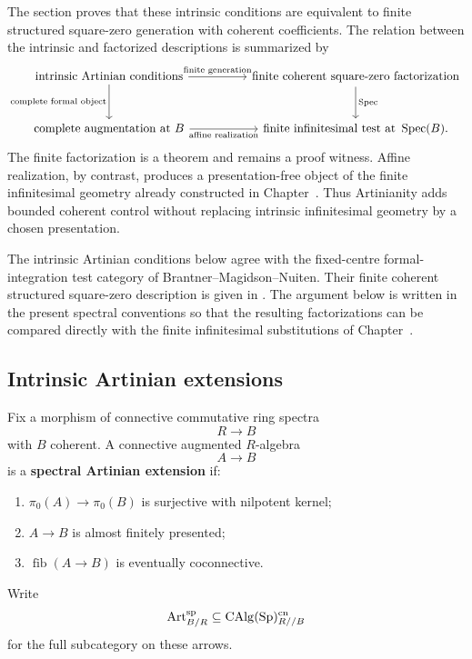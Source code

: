 The section proves that these intrinsic conditions are equivalent to finite structured
square-zero generation with coherent coefficients. The relation between the intrinsic
and factorized descriptions is summarized by
\[
\begin{tikzcd}[column sep=huge,row sep=large]
    \text{intrinsic Artinian conditions}
        \arrow[r,"\text{finite generation}"]
        \arrow[d,"\text{complete formal object}"']
    &
    \text{finite coherent square-zero factorization}
        \arrow[d,"\operatorname{Spec}"]
    \\
    \text{complete augmentation at }B
        \arrow[r,"\text{affine realization}"']
    &
    \text{finite infinitesimal test at }\Spec(B).
\end{tikzcd}
\]
The finite factorization is a theorem and remains a proof witness. Affine realization,
by contrast, produces a presentation-free object of the finite infinitesimal geometry
already constructed in Chapter~. Thus
Artinianity adds bounded coherent control without replacing intrinsic infinitesimal
geometry by a chosen presentation.

\begin{remark}
\label{rem:bmn-artinian-comparison}
The intrinsic Artinian conditions below agree with the fixed-centre
formal-integration test category of Brantner--Magidson--Nuiten. Their
finite coherent structured square-zero description is given in
\cite[
    Proposition~4.3 and Corollaries~4.4--4.5
]{BrantnerMagidsonNuiten}. The argument below is written in the present
spectral conventions so that the resulting factorizations can be compared
directly with the finite infinitesimal substitutions of
Chapter~.
\end{remark}

\subsection{Intrinsic Artinian extensions}

\begin{definition}
\label{def:spectral-artinian-extension}
Fix a morphism of connective commutative ring spectra
\[
    R\longrightarrow B
\]
with \(B\) coherent. A connective augmented \(R\)-algebra
\[
    A\longrightarrow B
\]
is a \textbf{spectral Artinian extension} if:
\begin{enumerate}[label=(\roman*)]
    \item \(\pi_0(A)\to\pi_0(B)\) is surjective with nilpotent kernel;
    \item \(A\to B\) is almost finitely presented;
    \item \(\operatorname{fib}(A\to B)\) is eventually coconnective.
\end{enumerate}
Write
\[
    \operatorname{Art}^{\mathrm{sp}}_{B/R}
    \subseteq
    \operatorname{CAlg}(\operatorname{Sp})^{\mathrm{cn}}_{R//B}
\]
for the full subcategory on these arrows.
\end{definition}

